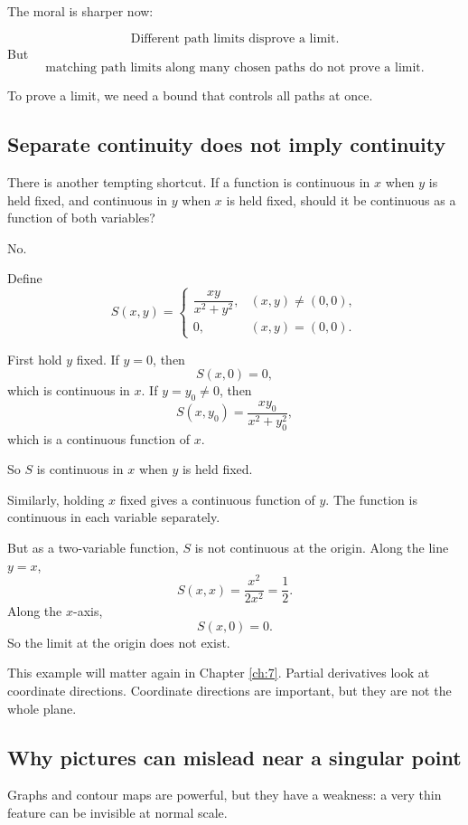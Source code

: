 The moral is sharper now:

\[
    \text{Different path limits disprove a limit.}
\]
But
\[
    \text{matching path limits along many chosen paths do not prove a limit.}
\]

To prove a limit, we need a bound that controls all paths at once.

\subsection{Separate continuity does not imply continuity}

There is another tempting shortcut.  If a function is continuous in \(x\) when \(y\) is
held fixed, and continuous in \(y\) when \(x\) is held fixed, should it be continuous
as a function of both variables?

No.

Define
\[
    S(x,y)=
    \begin{cases}
    \dfrac{xy}{x^2+y^2}, & (x,y)\ne(0,0),\\[2mm]
    0, & (x,y)=(0,0).
    \end{cases}
\]

First hold \(y\) fixed.  If \(y=0\), then
\[
    S(x,0)=0,
\]
which is continuous in \(x\).  If \(y=y_0\ne0\), then
\[
    S(x,y_0)=\frac{xy_0}{x^2+y_0^2},
\]
which is a continuous function of \(x\).

So \(S\) is continuous in \(x\) when \(y\) is held fixed.

Similarly, holding \(x\) fixed gives a continuous function of \(y\).  The function is
continuous in each variable separately.

But as a two-variable function, \(S\) is not continuous at the origin.  Along the line
\(y=x\),
\[
    S(x,x)=\frac{x^2}{2x^2}=\frac12.
\]
Along the \(x\)-axis,
\[
    S(x,0)=0.
\]
So the limit at the origin does not exist.

This example will matter again in Chapter \ref{ch:7}.  Partial derivatives look at
coordinate directions.  Coordinate directions are important, but they are not the whole
plane.

\subsection{Why pictures can mislead near a singular point}

Graphs and contour maps are powerful, but they have a weakness: a very thin feature
can be invisible at normal scale.

